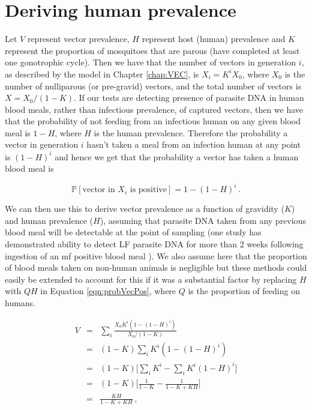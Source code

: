 \section[Human prevalence]{Deriving human prevalence}

Let $V$ represent vector prevalence, $H$ represent host (human) prevalence and $K$ represent the proportion of mosquitoes that are parous (have completed at least one gonotrophic cycle). Then we have that the number of vectors in generation $i$, as described by the model in Chapter \ref{chap:VEC}, is $X_i = K^iX_0$, where $X_0$ is the number of nulliparous (or pre-gravid) vectors, and the total number of vectors is $X = X_0/(1-K)$. If our tests are detecting presence of parasite DNA in human blood meals, rather than infectious prevalence, of captured vectors, then we have that the probability of not feeding from an infectious human on any given blood meal is $1-H$, where $H$ is the human prevalence. Therefore the probability a vector in generation $i$ hasn't taken a meal from an infection human at any point is $(1-H)^i$ and hence we get that the probability a vector has taken a human blood meal is

\begin{equation}
    \mathbb{P}[\mbox{vector in } X_i \mbox{ is positive}] = 1-(1-H)^i\,.
    \label{eqn:probVecPos}
\end{equation}

We can then use this to derive vector prevalence as a function of gravidity ($K$) and human prevalence ($H$), assuming that parasite DNA taken from any previous blood meal will be detectable at the point of sampling (one study has demonstrated ability to detect LF parasite DNA for more than 2 weeks following ingestion of an mf positive blood meal \cite{fischer2007}). We also assume here that the proportion of blood meals taken on non-human animals is negligible but these methods could easily be extended to account for this if it was a substantial factor by replacing $H$ with $QH$ in Equation \ref{eqn:probVecPos}, where $Q$ is the proportion of feeding on humans.

\begin{eqnarray}
V &=& \sum_{i}\frac{X_0K^i(1-(1-H)^i)}{X_0/(1-K)}\\
&=& (1-K)\sum_{i}K^i(1-(1-H)^i)\\
&=& (1-K)\Big[\sum_{i}K^i - \sum_{i}K^i(1-H)^i \Big]\\
&=& (1-K)\Bigg[\frac{1}{1-K} - \frac{1}{1-K+KH}\Bigg]\\
&=& \frac{KH}{1-K+KH}\,,
\end{eqnarray}

